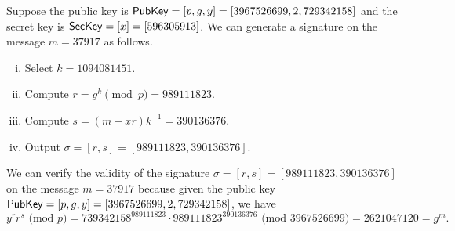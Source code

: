 \begin{exmp}
    Suppose the public key is ${\sf PubKey} = [p, g, y] = [3967526699, 2, 729342158]$ 
    and the secret key is ${\sf SecKey} = [x] = [596305913]$. We can generate a 
    signature on the message $m = 37917$ as follows. 
    \begin{enumerate}[(i)]
        \item Select $k = 1094081451$. 
        \item Compute $r = g^k \pmod p = 989111823$. 
        \item Compute $s = (m - xr)k^{-1} = 390136376$. 
        \item Output $\sigma = [r, s] = [989111823, 390136376]$. 
    \end{enumerate}
    We can verify the validity of the signature $\sigma = [r, s] 
    = [989111823, 390136376]$ on the message $m = 37917$ because given the 
    public key ${\sf PubKey} = [p, g, y] = [3967526699, 2, 729342158]$, we have 
    \[ y^r r^s \text{ (mod $p$)} = 739342158^{989111823} \cdot 989111823^{390136376}
    \text{ (mod $3967526699$)} = 2621047120 = g^m. \] 
\end{exmp}


